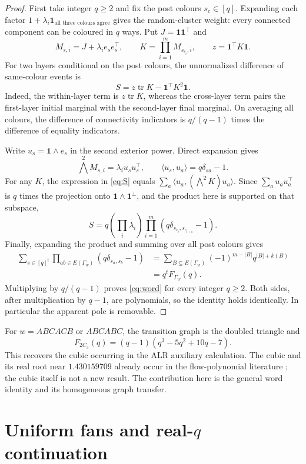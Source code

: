 \documentclass[11pt,a4paper]{article}
\theoremstyle{remark}\newtheorem{remark}[theorem]{Remark}
\DeclareMathOperator{\tr}{tr}\DeclareMathOperator{\diag}{diag}
\newcommand{\one}{\mathbf 1}\newcommand{\N}{\mathcal N}
\begin{document}
\begin{proof}
First take integer $q\ge2$ and fix the post colours $s_c\in[q]$. Expanding each factor $1+\lambda_i\one_{\text{all three colours agree}}$ gives the random-cluster weight: every connected component can be coloured in $q$ ways. Put $J=\one\one^\top$ and
\[
M_{s,i}=J+\lambda_i e_se_s^\top,\qquad
K=\prod_{i=1}^m M_{s_{c_i},i},\qquad z=\one^\top K\one.
\]
For two layers conditional on the post colours, the unnormalized difference of same-colour events is
\begin{equation}\label{eq:S}
S=z\tr K-\one^\top K^2\one.
\end{equation}
Indeed, the within-layer term is $z\tr K$, whereas the cross-layer term pairs the first-layer initial marginal with the second-layer final marginal. On averaging all colours, the difference of connectivity indicators is $q/(q-1)$ times the difference of equality indicators.

Write $u_s=\one\wedge e_s$ in the second exterior power. Direct expansion gives
\[
\bigwedge^2 M_{s,i}=\lambda_i u_su_s^\top,
\qquad \langle u_s,u_a\rangle=q\delta_{sa}-1.
\]
For any $K$, the expression in \eqref{eq:S} equals
$\sum_a\langle u_a,(\bigwedge^2K)u_a\rangle$. Since
$\sum_a u_au_a^\top$ is $q$ times the projection onto
$\one\wedge\one^\perp$, and the product here is supported on that subspace,
\[
S=q\left(\prod_i\lambda_i\right)
\prod_{i=1}^m(q\delta_{s_{c_i},s_{c_{i+1}}}-1).
\]
Finally, expanding the product and summing over all post colours gives
\begin{align*}
\sum_{s\in[q]^t}\prod_{ab\in E(\Gamma_w)}(q\delta_{s_a,s_b}-1)
&=\sum_{B\subseteq E(\Gamma_w)}(-1)^{m-|B|}q^{|B|+k(B)}\\
&=q^tF_{\Gamma_w}(q).
\end{align*}
Multiplying by $q/(q-1)$ proves \eqref{eq:word} for every integer $q\ge2$. Both sides, after multiplication by $q-1$, are polynomials, so the identity holds identically. In particular the apparent pole is removable.
\end{proof}
For $w=ABCACB$ or $ABCABC$, the transition graph is the doubled triangle and
\[
F_{2C_3}(q)=(q-1)(q^3-5q^2+10q-7).
\]
This recovers the cubic occurring in the ALR auxiliary calculation. The cubic and its real root near $1.430159709$ already occur in the flow-polynomial literature \cite{Dong}; the cubic itself is not a new result. The contribution here is the general word identity and its homogeneous graph transfer.

\section{Uniform fans and real-$q$ continuation}
\end{document}
